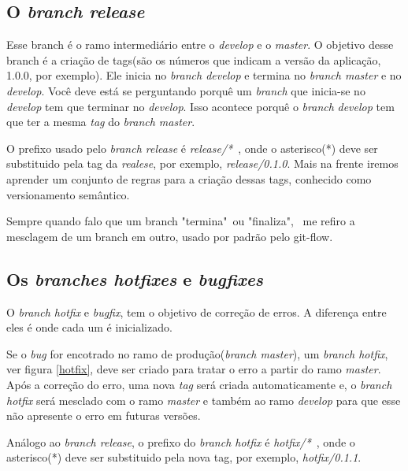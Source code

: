 \documentclass[12pt,openright,oneside,a4paper,english,brazil]{abntex2}
\begin{document}
\subsection{O \textit{branch release}}

Esse branch é o ramo intermediário entre o \textit{develop} e o \textit{master}. O objetivo desse branch é a criação de tags(são os números que indicam a versão da aplicação, 1.0.0, por exemplo). Ele inicia no \textit{branch develop} e termina no \textit{branch master} e no \textit{develop}. Você deve está se perguntando porquê um \textit{branch} que inicia-se no \textit{develop} tem que terminar no \textit{develop}. Isso acontece porquê o \textit{branch} \textit{develop} tem que ter a mesma \textit{tag} do \textit{branch master}.

O prefixo usado pelo \textit{branch release} é \textit{release/*}\ , onde o asterisco(*) deve ser substituido pela tag da \textit{realese}, por exemplo, \textit{release/0.1.0}. Mais na frente iremos aprender um conjunto de regras para a criação dessas tags, conhecido como versionamento semântico.

Sempre quando falo que um branch "termina"\ ou "finaliza", \ me refiro a mesclagem de um branch em outro, usado por padrão pelo git-flow.

\subsection{Os \textit{branches hotfixes} e \textit{bugfixes}}

O \textit{branch hotfix} e \textit{bugfix}, tem o objetivo de correção de erros. A diferença entre eles é onde cada um é inicializado. 

Se o \textit{bug} for encotrado no ramo de produção(\textit{branch master}), um \textit{branch hotfix}, ver figura \ref{hotfix}, deve ser criado para tratar o erro a partir do ramo \textit{master}. Após a correção do erro, uma nova \textit{tag} será criada automaticamente e, o \textit{branch hotfix} será mesclado com o ramo \textit{master} e também ao ramo \textit{develop} para que esse não apresente o erro em futuras versões.

Análogo ao \textit{branch release}, o prefixo do \textit{branch hotfix} é \textit{hotfix/*}\ , onde o asterisco(*) deve ser substituido pela nova tag, por exemplo, \textit{hotfix/0.1.1}.
\end{document}
